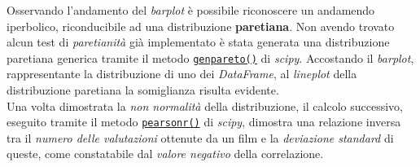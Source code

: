 \documentclass{article}
\begin{document}
        Osservando l'andamento del \textit{barplot} è possibile riconoscere un andamendo iperbolico, riconducibile ad una distribuzione \textbf{paretiana}. Non avendo trovato alcun test di \textit{paretianità} già implementato è stata generata una distribuzione paretiana generica tramite il metodo \href{https://docs.scipy.org/doc/scipy/reference/generated/scipy.stats.genpareto.html}{\texttt{genpareto()}} di \textit{scipy}. Accostando il \textit{barplot}, rappresentante la distribuzione di uno dei \textit{DataFrame}, al \textit{lineplot} della distribuzione paretiana la somiglianza risulta evidente.\\
        Una volta dimostrata la \textit{non normalità} della distribuzione, il calcolo successivo, eseguito tramite il metodo \href{https://docs.scipy.org/doc/scipy/reference/generated/scipy.stats.pearsonr.html}{\texttt{pearsonr()}} di \textit{scipy}, dimostra una relazione inversa tra il \textit{numero delle valutazioni} ottenute da un film e la \textit{deviazione standard} di queste, come constatabile dal \textit{valore negativo} della correlazione.

    \newpage
\end{document}

